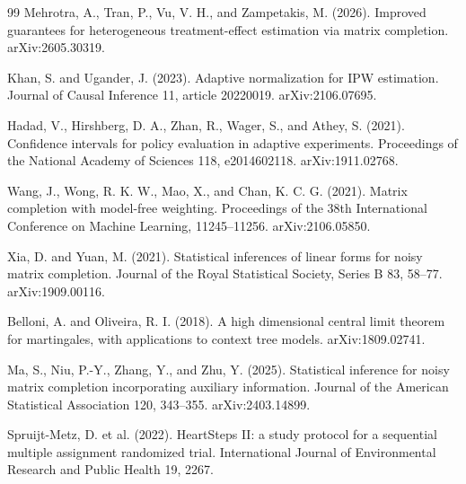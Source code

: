 \documentclass{article}
\begin{document}
\begin{thebibliography}{99}
   Mehrotra, A., Tran, P., Vu, V. H., and Zampetakis, M. (2026). Improved guarantees for heterogeneous treatment-effect estimation via matrix completion. arXiv:2605.30319.

   Khan, S. and Ugander, J. (2023). Adaptive normalization for IPW estimation. Journal of Causal Inference 11, article 20220019. arXiv:2106.07695.

   Hadad, V., Hirshberg, D. A., Zhan, R., Wager, S., and Athey, S. (2021). Confidence intervals for policy evaluation in adaptive experiments. Proceedings of the National Academy of Sciences 118, e2014602118. arXiv:1911.02768.

   Wang, J., Wong, R. K. W., Mao, X., and Chan, K. C. G. (2021). Matrix completion with model-free weighting. Proceedings of the 38th International Conference on Machine Learning, 11245--11256. arXiv:2106.05850.

   Xia, D. and Yuan, M. (2021). Statistical inferences of linear forms for noisy matrix completion. Journal of the Royal Statistical Society, Series B 83, 58--77. arXiv:1909.00116.

   Belloni, A. and Oliveira, R. I. (2018). A high dimensional central limit theorem for martingales, with applications to context tree models. arXiv:1809.02741.

   Ma, S., Niu, P.-Y., Zhang, Y., and Zhu, Y. (2025). Statistical inference for noisy matrix completion incorporating auxiliary information. Journal of the American Statistical Association 120, 343--355. arXiv:2403.14899.

   Spruijt-Metz, D. et al. (2022). HeartSteps II: a study protocol for a sequential multiple assignment randomized trial. International Journal of Environmental Research and Public Health 19, 2267.

\end{thebibliography}
\end{document}
